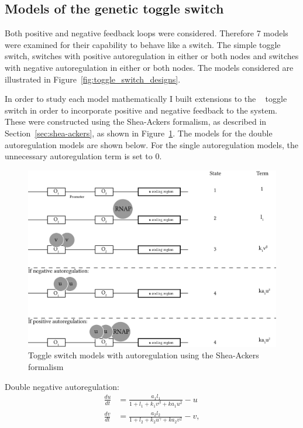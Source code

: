 \subsection{Models of the genetic toggle switch}
\label{sec:models_bist}

Both positive and negative feedback loops were considered. Therefore 7 models were examined for their capability to behave like a switch. The simple toggle switch, switches with positive autoregulation in either or both nodes and switches with negative autoregulation in either or both nodes. The models considered are illustrated in Figure~\ref{fig:toggle_switch_designs}. 

 In order to study each model mathematically I built extensions to the ~\autocite{Gardner:2000vha} toggle switch in order to incorporate positive and negative feedback to the system. These were constructed using the Shea-Ackers formalism, as described in Section~\ref{sec:shea-ackers}, as shown in Figure~\ref{fig:sa-autoreg}. The models for the double autoregulation models are shown below. For the single autoregulation models, the unnecessary autoregulation term is set to 0.


\begin{figure}[tb]
\centerfloat
\includegraphics[scale=0.7]{../../chapters/chapterABCSysBio/images/shea-ackers_autoreg.png}
\caption[Toggle switch models with autoregulation using the Shea-Ackers formalism]{\label{fig:sa-autoreg}Toggle switch models with autoregulation using the Shea-Ackers formalism}
\end{figure}



Double negative autoregulation: 
\begin{align}\label{eq:gards_neg}
\frac{du}{dt} &= \frac{a_1  l_1}{1+l_1+k_1  v^{\beta} + ka_{1}  u^{2}} - u \\
\frac{dv}{dt} &= \frac{a_2  l_2}{1+l_2+k_2  u^{\gamma }+ ka_{2}  v^{2}} - v,
\end{align}

